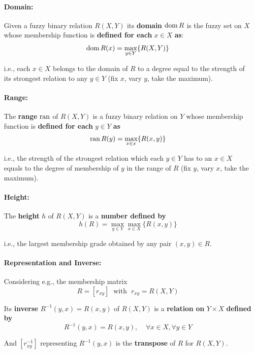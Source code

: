 \paragraph{Domain:} Given a fuzzy binary relation $R(X,Y)$ its \textbf{domain} $\operatorname*{dom} R$ is the fuzzy set on $X$ whose membership function is \textbf{defined for each} $x \in X$ \textbf{as}:
$$ \operatorname*{dom} R (x) = \max_{y \in Y} \{R(X,Y)\} $$

i.e., each $x \in X$ belongs to the domain of $R$ to a degree equal to the strength of its strongest relation to any $y \in Y$ (fix $x$, vary $y$, take the maximum).\\

\paragraph{Range:} The \textbf{range} $\operatorname*{ran}$ of $R(X,Y)$ is a fuzzy binary relation on $Y$ whose membership function is \textbf{defined for each} $y \in Y$ \textbf{as} 
$$ \operatorname*{ran} R(y) = \max_{x \in x} \{R(x,y)\} $$

i.e., the strength of the strongest relation which each $y \in Y$ has to an $x \in X$ equals to the degree of membership of $y$ in the range of $R$ (fix $y$, vary $x$, take the maximum).\\

\paragraph{Height:} The \textbf{height} $h$ of $R(X,Y)$ is a \textbf{number defined by} 
$$ h(R) = \max_{y \in Y} \max_{x \in X} \{R(x,y)\}$$

i.e., the largest membership grade obtained by any pair $(x,y) \in R$.\\

\newpage

\paragraph{Representation and Inverse:} Considering e.g., the membership matrix 
$$ R = [r_{xy}] \; \text{ with } \; r_{xy} = R(X,Y) $$

Its \textbf{inverse} $R^{-1}(y,x) = R(x,y)$ of $R(X,Y)$ is a \textbf{relation on} $Y \times X$ \textbf{defined by}
$$ R^{-1} (y,x) = R(x,y), \;\;\;\; \forall x \in X, \forall y \in Y $$

And $[r_{xy}^{-1}]$ representing $R^{-1} (y,x)$ is the \textbf{transpose} of $R$ for $R(X,Y)$.\\

